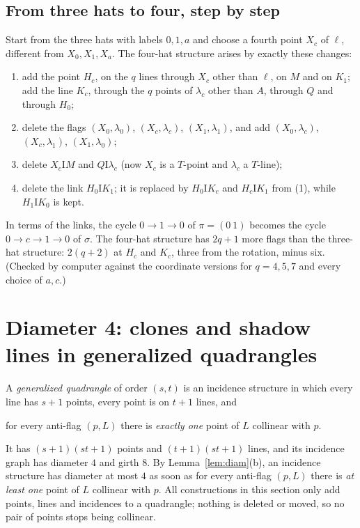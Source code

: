 \documentclass[11pt]{amsart}
\theoremstyle{definition}
\theoremstyle{remark}
\newcommand{\I}{\mathrel{\mathrm{I}}}
\newcommand{\lam}{\lambda}
\begin{document}
\subsection{From three hats to four, step by step}\label{ssec:steps}
Start from the three hats with labels $0,1,a$ and choose a fourth point $X_c$ of $\ell$, different from $X_0,X_1,X_a$. The four-hat structure arises by exactly these changes:
\begin{enumerate}[label=\textup{(\arabic*)},leftmargin=2.5em]
\item add the point $H_c$, on the $q$ lines through $X_c$ other than $\ell$, on $M$ and on $K_1$; add the line $K_c$, through the $q$ points of $\lam_c$ other than $A$, through $Q$ and through $H_0$;
\item delete the flags $(X_0,\lam_0)$, $(X_c,\lam_c)$, $(X_1,\lam_1)$, and add $(X_0,\lam_c)$, $(X_c,\lam_1)$, $(X_1,\lam_0)$;
\item delete $X_c\I M$ and $Q\I\lam_c$ (now $X_c$ is a $T$-point and $\lam_c$ a $T$-line);
\item delete the link $H_0\I K_1$; it is replaced by $H_0\I K_c$ and $H_c\I K_1$ from (1), while $H_1\I K_0$ is kept.
\end{enumerate}
In terms of the links, the cycle $0\to1\to0$ of $\pi=(0\ 1)$ becomes the cycle $0\to c\to 1\to 0$ of $\sigma$. The four-hat structure has $2q+1$ more flags than the three-hat structure: $2(q+2)$ at $H_c$ and $K_c$, three from the rotation, minus six. (Checked by computer against the coordinate versions for $q=4,5,7$ and every choice of $a,c$.)

\section{Diameter 4: clones and shadow lines in generalized quadrangles}\label{sec:d4}

A \emph{generalized quadrangle} of order $(s,t)$ is an incidence structure in which every line has $s+1$ points, every point is on $t+1$ lines, and
\begin{center}
for every anti-flag $(p,L)$ there is \emph{exactly one} point of $L$ collinear with $p$.
\end{center}
It has $(s+1)(st+1)$ points and $(t+1)(st+1)$ lines, and its incidence graph has diameter $4$ and girth $8$. By Lemma~\ref{lem:diam}(b), an incidence structure has diameter at most $4$ as soon as for every anti-flag $(p,L)$ there is \emph{at least one} point of $L$ collinear with $p$. All constructions in this section only add points, lines and incidences to a quadrangle; nothing is deleted or moved, so no pair of points stops being collinear.
\end{document}
